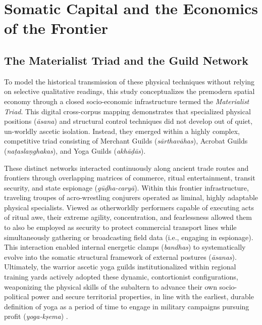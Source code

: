 \documentclass[11pt,twoside,letterpaper]{article}
\begin{document}
\section{Somatic Capital and the Economics of the Frontier}
\label{sec:somatic_capital_frontier_economics}

\subsection{The Materialist Triad and the Guild Network}

To model the historical transmission of these physical techniques without relying on selective qualitative readings, this study conceptualizes the premodern spatial economy through a closed socio-economic infrastructure termed the \textit{Materialist Triad}. This digital cross-corpus mapping demonstrates that specialized physical positions (\textit{āsana}) and structural control techniques did not develop out of quiet, un-worldly ascetic isolation. Instead, they emerged within a highly complex, competitive triad consisting of Merchant Guilds (\textit{sārthavāhas}), Acrobat Guilds (\textit{naṭas}\text{/}\textit{laṇghakas}), and Yoga Guilds (\textit{akhāḍās}).

These distinct networks interacted continuously along ancient trade routes and frontiers through overlapping matrices of commerce, ritual entertainment, transit security, and state espionage (\textit{gūḍha-caryā}). Within this frontier infrastructure, traveling troupes of acro-wrestling conjurers operated as liminal, highly adaptable physical specialists. Viewed as otherworldly performers capable of executing acts of ritual awe, their extreme agility, concentration, and fearlessness allowed them to also be employed as security to protect commercial transport lines while simultaneously gathering or broadcasting field data (i.e., engaging in espionage). This interaction enabled internal energetic clamps (\textit{bandhas}) to systematically evolve into the somatic structural framework of external postures (\textit{āsanas}). Ultimately, the warrior ascetic yoga guilds institutionalized within regional training yards actively adopted these dynamic, contortionist configurations, weaponizing the physical skills of the subaltern to advance their own socio-political power and secure territorial properties, in line with the earliest, durable definition of yoga as a period of time to engage in military campaigns pursuing profit (\textit{yoga-kṣema}) \citep{oberlies2024,gwilt2024}.
\end{document}
